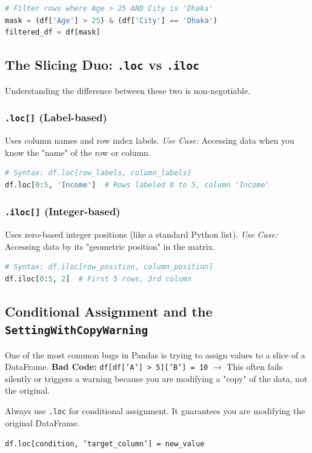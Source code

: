 \documentclass{article}
\begin{document}
\begin{lstlisting}[language=Python]
# Filter rows where Age > 25 AND City is 'Dhaka'
mask = (df['Age'] > 25) & (df['City'] == 'Dhaka')
filtered_df = df[mask]
\end{lstlisting}

\subsection{The Slicing Duo: \texttt{.loc} vs \texttt{.iloc}}
Understanding the difference between these two is non-negotiable.

\subsubsection{\texttt{.loc[]} (Label-based)}
Uses column names and row index labels. 
\textit{Use Case:} Accessing data when you know the "name" of the row or column.
\begin{lstlisting}[language=Python]
# Syntax: df.loc[row_labels, column_labels]
df.loc[0:5, 'Income']  # Rows labeled 0 to 5, column 'Income'
\end{lstlisting}

\subsubsection{\texttt{.iloc[]} (Integer-based)}
Uses zero-based integer positions (like a standard Python list).
\textit{Use Case:} Accessing data by its "geometric position" in the matrix.
\begin{lstlisting}[language=Python]
# Syntax: df.iloc[row_position, column_position]
df.iloc[0:5, 2]  # First 5 rows, 3rd column
\end{lstlisting}

\subsection{Conditional Assignment and the \texttt{SettingWithCopyWarning}}
One of the most common bugs in Pandas is trying to assign values to a slice of a DataFrame. 
\textbf{Bad Code:} \texttt{df[df['A'] > 5]['B'] = 10} $\to$ This often fails silently or triggers a warning because you are modifying a "copy" of the data, not the original.

\begin{tcolorbox}[colback=green!5!white,colframe=green!75!black,title=The Gold Standard]
Always use \texttt{.loc} for conditional assignment. It guarantees you are modifying the original DataFrame.
\begin{center}
\texttt{df.loc[condition, 'target\_column'] = new\_value}
\end{center}
\end{tcolorbox}
\end{document}
